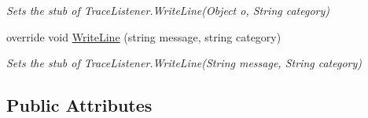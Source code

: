 \begin{DoxyCompactItemize}
\begin{DoxyCompactList}\small\item\em Sets the stub of Trace\-Listener.\-Write\-Line(\-Object o, String category)\end{DoxyCompactList}\item 
override void \hyperlink{class_system_1_1_diagnostics_1_1_fakes_1_1_stub_console_trace_listener_a9094e1fffd06e60501f46fcddf7c44f0}{Write\-Line} (string message, string category)
\begin{DoxyCompactList}\small\item\em Sets the stub of Trace\-Listener.\-Write\-Line(\-String message, String category)\end{DoxyCompactList}\end{DoxyCompactItemize}
\subsection*{Public Attributes}
